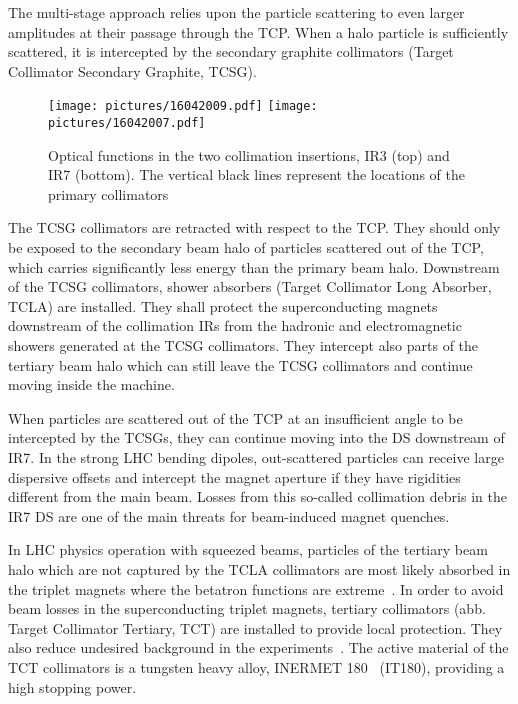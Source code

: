 \newpage
The multi-stage approach relies upon the particle scattering to even larger amplitudes at their passage through the TCP. When a halo particle is sufficiently scattered, it is intercepted by the secondary graphite collimators (Target Collimator Secondary Graphite, TCSG). 



% 
\begin{figure}[t]  
    \centering
    \texttt{[image: pictures/16042009.pdf]}
    \texttt{[image: pictures/16042007.pdf]}
    \caption{Optical functions in the two collimation insertions, IR3 (top) and IR7 (bottom). The vertical black lines represent the locations of the 
      primary collimators}  
    \label{pic:16042001}
\end{figure}
%
The TCSG collimators are retracted with respect to the TCP. They should only be exposed to the secondary beam halo of particles scattered out of the TCP, which carries significantly less energy than the primary beam halo. Downstream of the TCSG collimators, shower absorbers (Target Collimator Long Absorber, TCLA) are installed. They shall protect the superconducting magnets downstream of the collimation IRs from the hadronic and electromagnetic showers generated at the TCSG collimators. They intercept also parts of the tertiary beam halo which can still leave the TCSG collimators and continue moving inside the machine. 

When particles are scattered out of the TCP at an insufficient angle to be intercepted by the TCSGs, they can continue moving into the DS downstream of IR7. In the strong LHC bending dipoles, out-scattered particles can receive large dispersive offsets and intercept the magnet aperture if they have rigidities different from the main beam. Losses from this so-called collimation debris in the IR7 DS are one of the main threats for beam-induced magnet quenches. 

In LHC physics operation with squeezed beams, particles of the tertiary beam halo which are not captured by the TCLA collimators are most likely absorbed in the triplet magnets where the betatron functions are extreme~\cite{ipac2012:MOPPD062}. In order to avoid beam losses in the superconducting triplet magnets, tertiary collimators (abb. Target Collimator Tertiary, TCT) are installed to provide local protection. They also reduce undesired background in the experiments~\cite{Bruce2013825}. The active material of the TCT collimators is a tungsten heavy alloy, INERMET 180~\cite{intermet} (IT180), providing a high stopping power. 

